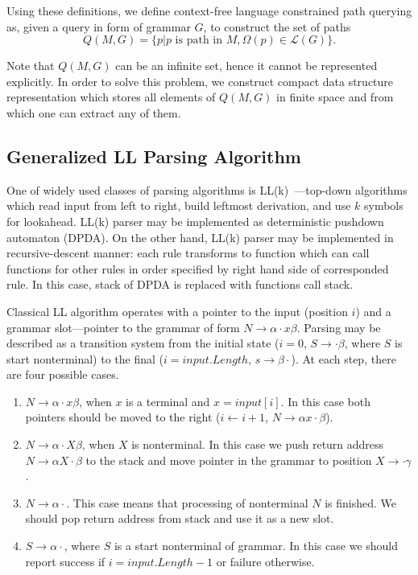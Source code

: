 Using these definitions, we define context-free language constrained path querying as, given a query in form of grammar $G$, to construct the set of paths $$Q(M,G)=\{p|p \text{ is path in } M, \Omega(p) \in \mathcal{L}(G)\}.$$

Note that $Q(M, G)$ can be an infinite set, hence it cannot be represented explicitly. 
In order to solve this problem, we construct compact data structure representation which stores all elements of $Q(M,G)$ in finite space and from which one can extract any of them.

\subsection{Generalized LL Parsing Algorithm}\label{BasicGLL}

One of widely used classes of parsing algorithms is LL(k)~\cite{Grune}---top-down algorithms which read input from left to right, build leftmost derivation, and use $k$ symbols for lookahead.
LL(k) parser may be implemented as deterministic pushdown automaton (DPDA).
On the other hand, LL(k) parser may be implemented in recursive-descent manner: each rule transforms to function which can call functions for other rules in order specified by right hand side of corresponded rule.
In this case, stack of DPDA is replaced with functions call stack.

Classical LL algorithm operates with a pointer to the input (position $i$) and a grammar slot---pointer to the grammar of form $N \rightarrow \alpha \cdot x \beta $.
Parsing may be described as a transition system from the initial state ($i = 0$, $S \rightarrow \cdot \beta $, where $S$ is start nonterminal) to the final ($i = input.Length$, $s \rightarrow \beta \cdot$).
At each step, there are four possible cases. 

\begin{enumerate}
\item $N \rightarrow \alpha \cdot x \beta $, when $x$ is a terminal and $x = input[i]$. In this case both pointers should be moved to the right ($i \leftarrow i + 1$, $N \rightarrow \alpha  x \cdot \beta $).
\item $N \rightarrow \alpha \cdot X \beta $, when $X$ is nonterminal. In this case we push return address $N \rightarrow \alpha X \cdot \beta $ to the stack and move pointer in the grammar to position $X \rightarrow \cdot \gamma$.\label{itm:2}
\item $N \rightarrow \alpha \cdot $. This case means that processing of nonterminal $N$ is finished. We should pop return address from stack and use it as a new slot.\label{itm:3}
\item $S \rightarrow \alpha \cdot $, where $S$ is a start nonterminal of grammar. In this case we should report success if $i = input.Length - 1$ or failure otherwise. 
\end{enumerate}

